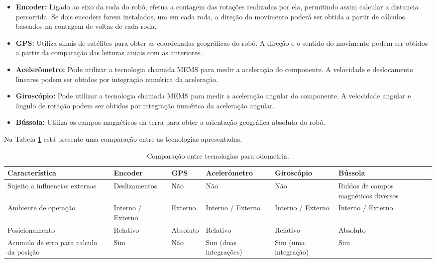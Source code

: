 \begin{itemize}
  \item \textbf{Encoder:} Ligado ao eixo da roda do robô, efetua a contagem das rotações realizadas por ela, permitindo assim calcular a distancia percorrida. Se dois encoders forem instalados, um em cada roda, a direção do movimento poderá ser obtida a partir de cálculos baseados na contagem de voltas de cada roda.
  \item \textbf{GPS:} Utiliza sinais de satélites para obter as coordenadas geográficas do robô. A direção e o sentido do movimento podem ser obtidos a partir da comparação das leituras atuais com as anteriores.
  \item 	\textbf{Acelerômetro:} Pode utilizar a tecnologia chamada MEMS para medir a aceleração do componente. A velocidade e deslocamento lineares podem ser obtidos por integração numérica da aceleração.
  \item 	\textbf{Giroscópio:} Pode utilizar a tecnologia chamada MEMS para medir a aceleração angular do componente. A velocidade angular e ângulo de rotação podem ser obtidos por integração numérica da aceleração angular.
  \item 	\textbf{Bússola:} Utiliza os campos magnéticos da terra para obter a orientação geográfica absoluta do robô.
\end{itemize}

Na Tabela \ref{tab:alternativas_tecnologias_odometria} está presente uma comparação entre as tecnologias apresentadas. 

\begin{table}[h]
  \caption{Comparação entre tecnologias para odometria.}
  \centering
  \begin{tabular}{p{3cm}|p{2.2cm}p{1.7cm}p{2.2cm}p{2.2cm}p{2.2cm}}
    \toprule
    \textbf{Característica} & \textbf{Encoder} & \textbf{GPS} & \textbf{Acelerômetro} & \textbf{Giroscópio} & \textbf{Bússola} \\
    \hline
    Sujeito a influencias externas & Deslizamentos & Não & Não & Não & Ruídos de campos magnéticos diversos \\
    \hline
    Ambiente de operação & Interno / Externo & Externo & Interno / Externo & Interno / Externo & Interno / Externo \\
    \hline
    Posicionamento & Relativo & Absoluto & Relativo & Relativo & Absoluto \\
    \hline
    Acumulo de erro para calculo da posição & Sim & Não & Sim (duas integrações) & Sim (uma integração) & Sim \\
    \bottomrule
  \end{tabular}
  \label{tab:alternativas_tecnologias_odometria}
\end{table}

